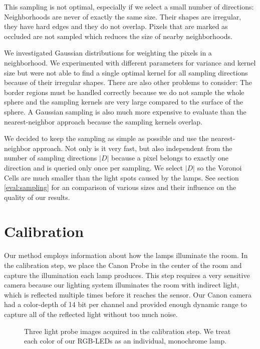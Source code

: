  This sampling is not optimal, especially if we select a small number of directions:
 Neighborhoods are never of exactly the same size. Their shapes are irregular, they have hard edges and they do not overlap. 
 Pixels that are marked as occluded are not sampled which reduces the size of nearby neighborhoods. 
 
 We investigated Gaussian distributions for weighting the pixels in a neighborhood. 
 We experimented with different parameters for variance and kernel size but were not able to find a single optimal kernel for all sampling directions because of their irregular shapes.
 There are also other problems to consider:
 The border regions must be handled correctly because we do not sample the whole sphere and the sampling kernels are very large compared to the surface of the sphere.
 A Gaussian sampling is also much more expensive to evaluate than the nearest-neighbor approach because the sampling kernels overlap.
 
 We decided to keep the sampling as simple as possible and use the nearest-neighbor approach. 
 Not only is it very fast, but also independent from the number of sampling directions $|D|$  because a pixel belongs to exactly one direction and is queried only once per sampling.
 We select $|D|$ so the Voronoi Cells are much smaller than the light spots caused by the lamps. 
 See  section \ref{eval:sampling} for an comparison of various sizes and their influence on the quality of our results.
 

\section{Calibration}
\label{sec:calibration}


 Our method employs information about how the lamps illuminate the room. 
 In the calibration step, we place the Canon Probe in the center of the room and capture the illumination each lamp produces.
 This step requires a very sensitive camera because our lighting system illuminates the room with indirect light, which is reflected multiple times before it reaches the sensor.
 Our Canon camera had a color-depth of 14 bit per channel and provided enough dynamic range to capture all of the reflected light without too much noise.
 
 \begin{figure}[h]
  \hfill
  \hfill
  \caption[Calibration images]{Three light probe images acquired in the calibration step. We treat each color of our RGB-LEDs as an individual, monochrome lamp.}
 \end{figure}

